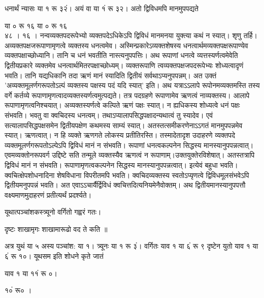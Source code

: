 \documentclass[11pt, openany]{book}
\begin{document}
\begin{sloppypar}
\hangindent=0.2in धनार्थं न्यासः या १ रू ३२ं। अयं वा या १ं रू ३२। अतो द्विविधमपि मानमुपपद्यते

\hspace{0.9in}या ० रू १६\hspace{0.55in} या ० रू १६\\

\hangindent=0.2in ४८ । १६ । नन्वव्यक्तपदरूपेभ्यो व्यक्तपदेऽधिकेऽपि द्विविधं मानमनया युक्त्या कथं न स्यात्। शृणु तर्हि। अव्यक्तपक्षजरूपाणामृणत्वे व्यक्तस्य धनत्वमेव। अस्मिन्प्रकारेऽव्यक्तशेषस्य धनत्वार्थमव्यक्तपक्षरूपाण्येव व्यक्तपक्षाच्छोध्यानि। तानि च धनं भवतीति नास्त्यनुपपत्तिः। अथ रूपाणां धनत्वे व्यत्तस्यर्णत्वमेवेति द्वितीयप्रकारे व्यक्तमेव धनत्वार्थमितरपक्षाच्छोध्यम्। व्यक्तरूपाणि त्वव्यक्तपक्षजपदरूपेभ्यः शोध्यत्वादृणं भवति। तानि यद्यधिकानि तदा ऋणं मानं स्यादिति द्वितीयं सर्वथाऽप्यनुपपन्नम्। अत उक्तं 'अव्यक्तमूलर्णगरूपतोऽल्पं व्यक्तस्य पक्षस्य पदं यदि स्यात्' इति। अथ यत्राऽऽलापे रूपोनमव्यक्तमस्ति तस्य वर्गे कर्तव्ये रूपाणामृणत्वादव्यक्तस्यर्णत्वमुत्पद्यते। तत्र पदग्रहणे रूपाणामेव ऋणत्वं नाव्यक्तस्य। आलापे रूपाणामृणत्वनिश्चयात्। अव्यक्तस्यर्णत्वे कल्पिते ऋणं पक्षः स्यात्। न ह्यधिकस्य शोध्यत्वे धनं पक्षः संभवति। भवतु वा क्वचिदस्य धनत्वम्। तथाऽप्यालापसिद्धपक्षादन्यथात्वं तु स्यादेव। एवं सत्यालापसिद्धपक्षसमेन द्वितीयपक्षेण कथमस्य साम्यं स्यात्। अतस्तत्समीकरणेनाऽऽगतं मानमुपपन्नमेव स्यात्। ऋणत्वात्। न हि व्यक्ते ऋणगते लोकस्य प्रतीतिरस्ति। तस्मादेतादृश उदाहरणे व्यक्तपदे व्यक्तमूलर्णगरूपतोऽल्पेऽपि द्विविधं मानं न संभवति। रूपाणां धनत्वकल्पनेन सिद्धस्य मानस्यानुपपन्नत्वात्। एवमव्यक्तोनरूपवर्ग उद्दिष्टे सति तन्मूले व्यक्तस्यैव ऋणत्वं न रूपाणाम्।उक्तयुक्तेरविशेषात्। अतस्तत्रापि द्विविधं मानं न संभवति। रूपाणामृणत्वकल्पनेन सिद्धस्य मानस्यानुपपन्नत्वात्। इत्येवं बहुधा भवति। क्वचित्क्षेपशोधनादिना शेषविधाना विपरीतमपि भवति। क्वचिदव्यक्तस्य स्वतोऽप्यृणत्वे द्विविधमूलसंभवेऽपि द्वितीयमनुपपन्नं भवति। अत एवाऽऽचार्यैर्द्विविधं क्वचित्तदित्यनियमेनैवोक्तम्। अथ द्वितीयमानस्यानुपपत्तौ वक्ष्यमाणमुदाहरणं प्रतीत्यर्थं प्रदर्श्यते। 

\begin{center}
यूथात्पञ्चांशकस्त्र्यूनो वर्गितो गह्वरं गतः।

दृष्टः शाखामृगः शाखामारूढो वद ते कति ॥
\end{center}

\hangindent=0.2in \hspace{0.2in}अत्र युथं या ५ अस्य पञ्चांश: या १। त्र्यूनः या १ रू ३ं। वर्गितः याव १ या ६ं रू ९ \textbar दृष्टेन युतो याव १ या ६ं रू १०। यूथसम इति शोधने कृते जातं

\hspace{0.25in}याव १ या ११ं रू ०।

\hspace{0.95in}१०ं रू० ।
\end{sloppypar}
\thispagestyle{empty}
\newpage
\end{document}
